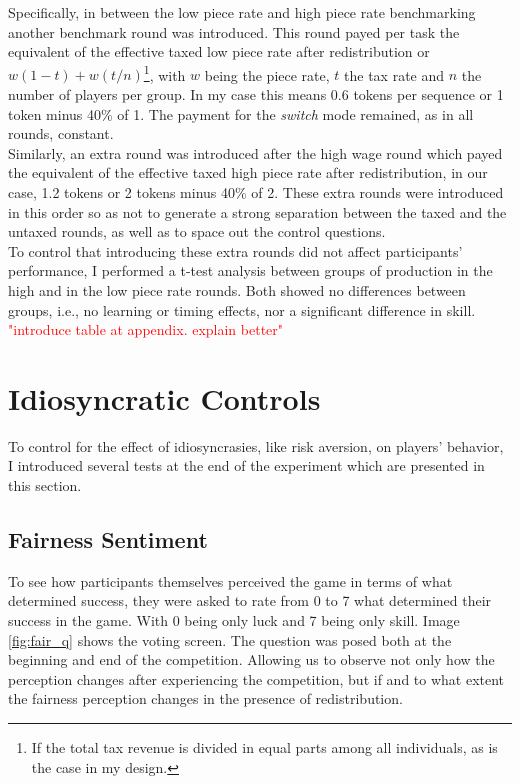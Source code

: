     Specifically, in between the low piece rate and high piece rate benchmarking another benchmark round was introduced. This round payed per task the equivalent of the effective taxed low piece rate after redistribution or $w(1-t)+ w(t/n)$\footnote{If the total tax revenue is divided in equal parts among all individuals, as is the case in my design.}, with $w$ being the piece rate, $t$ the tax rate and $n$ the number of players per group. In my case this means 0.6 tokens per sequence or 1 token minus 40\% of 1. The payment for the \textit{switch} mode remained, as in all rounds, constant.\\
    
    Similarly, an extra round was introduced after the high wage round which payed the equivalent of the effective taxed high piece rate after redistribution, in our case, 1.2 tokens or 2 tokens minus 40\% of 2. These extra rounds were introduced in this order so as not to generate a strong separation between the taxed and the untaxed rounds, as well as to space out the control questions. \\ 
    
    To control that introducing these extra rounds did not affect participants' performance, I performed a t-test analysis between groups of production in the high and in the low piece rate rounds. Both showed no differences between groups, i.e., no learning or timing effects, nor a significant difference in skill.
    \textcolor{red}{"introduce table at appendix. explain better"}
    
    \section{Idiosyncratic Controls}
    
    To control for the effect of idiosyncrasies, like risk aversion, on players' behavior, I introduced several tests at the end of the experiment which are presented in this section. 
    
    \subsection{Fairness Sentiment}
    
    To see how participants themselves perceived the game in terms of what determined success, they were asked to rate from 0 to 7 what determined their success in the game. With 0 being only luck and 7 being only skill. Image \ref{fig:fair_q} shows the voting screen. The question was posed both at the beginning and end of the competition. Allowing us to observe not only how the perception changes after experiencing the competition, but if and to what extent the fairness perception changes in the presence of redistribution.\\
    
